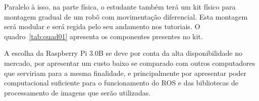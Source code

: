 Paralelo à isso, na parte física, o estudante também terá um kit físico para montagem gradual de um robô com movimentação diferencial. Esta montagem será modular e será regida pelo seu andamento nos tutoriais. O quadro~\ref{tab:quad01} apresenta os componentes presentes no kit.

\begin{table}[]
	\centering
	\caption{Relação dos Componentes Presentes no Kit Físico.}
	\label{tab:quad01}
\end{table}

A escolha da Raspberry Pi 3.0B se deve por conta da alta disponibilidade no mercado, por apresentar um custo baixo se comparado com outros computadores que serviriam para a mesma finalidade, e principalmente por apresentar poder computacional suficiente para o funcionamento do ROS e das bibliotecas de processamento de imagens que serão utilizadas.


